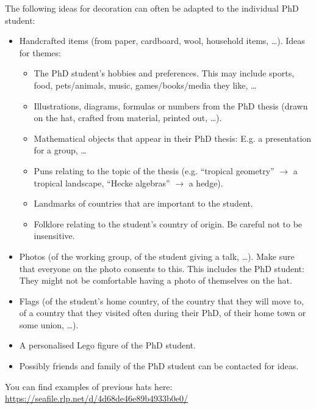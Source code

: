 \documentclass[a4paper,10pt]{article}
\begin{document}
	The following ideas for decoration can often be adapted to the individual PhD student:
	\begin{itemize}
		\item Handcrafted items (from paper, cardboard, wool, household items, \dots). Ideas for themes:
		\begin{itemize}
			\item The PhD student's hobbies and preferences. This may include sports, food, pets/animals, music, games/books/media they like, \dots
			
			\item Illustrations, diagrams, formulas or numbers from the PhD thesis (drawn on the hat, crafted from material, printed out, \dots).
			
			\item Mathematical objects that appear in their PhD thesis: E.g. a presentation for a group, \dots
			
			\item Puns relating to the topic of the thesis (e.g. \enquote{tropical geometry} $\to$ a tropical landscape, \enquote{Hecke algebras} $\to$ a hedge).
			
			\item Landmarks of countries that are important to the student.
			
			\item Folklore relating to the student's country of origin. Be careful not to be insensitive.
		\end{itemize}
		
		\item Photos (of the working group, of the student giving a talk, \dots). Make sure that everyone on the photo consents to this. This includes the PhD student: They might not be comfortable having a photo of themselves on the hat.
		
		\item Flags (of the student's home country, of the country that they will move to, of a country that they visited often during their PhD, of their home town or some union, \dots).
		
		\item A personalised Lego figure of the PhD student.
		

		
		\item Possibly friends and family of the PhD student can be contacted for ideas.
	\end{itemize}
	
	You can find examples of previous hats here: \url{https://seafile.rlp.net/d/4d68de46e89b4933b0e0/}
\end{document}
